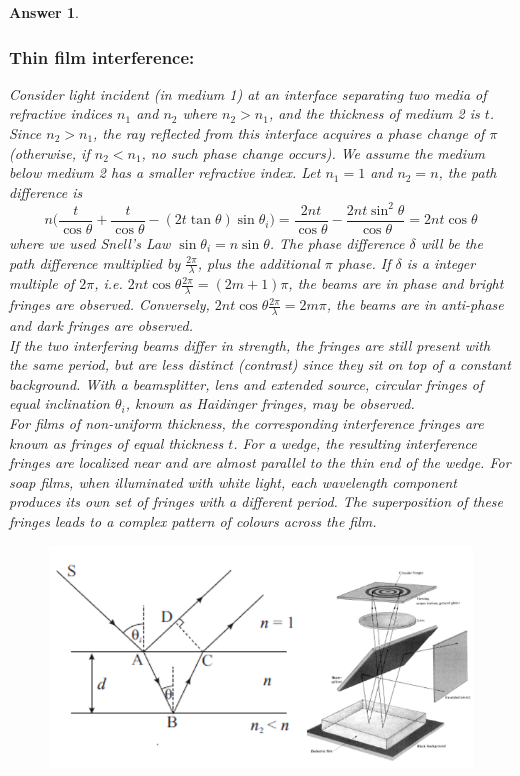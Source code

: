 \documentclass[a4paper]{article}
\newtheorem{ans}{Answer}[subsection]
\theoremstyle{new}
\begin{document}
\begin{ans}
\subsubsection*{Thin film interference:}
Consider light incident (in medium 1) at an interface separating two media of refractive indices $n_1$ and $n_2$ where $n_2>n_1$, and the thickness of medium 2 is $t$. Since $n_2>n_1$, the ray reflected from this interface acquires a phase change of $\pi$ (otherwise, if $n_2<n_1$, no such phase change occurs). We assume the medium below medium 2 has a smaller refractive index. Let $n_1=1$ and $n_2=n$, the path difference is
$$n\bigg(\frac{t}{\cos\theta}+\frac{t}{\cos\theta}-(2t\tan\theta)\sin\theta_i\bigg)=\frac{2nt}{\cos\theta}-\frac{2nt\sin^2\theta}{\cos\theta}=2nt\cos\theta$$
where we used Snell's Law $\sin\theta_i=n\sin\theta$. The phase difference $\delta$ will be the path difference multiplied by $\frac{2\pi}{\lambda}$, plus the additional $\pi$ phase. If $\delta$ is a integer multiple of $2\pi$, i.e. $2nt\cos\theta\frac{2\pi}{\lambda}=(2m+1)\pi$, the beams are in phase and bright fringes are observed. Conversely, $2nt\cos\theta\frac{2\pi}{\lambda}=2m\pi$, the beams are in anti-phase and dark fringes are observed. \\[5pt]
If the two interfering beams differ in strength, the fringes are still present with the same period, but are less distinct (contrast) since they sit on top of a constant background. With a beamsplitter, lens and extended source, circular fringes of equal inclination $\theta_i$, known as Haidinger fringes, may be observed.\\[5pt]
For films of non-uniform thickness, the corresponding interference fringes are known as fringes of equal thickness $t$. For a wedge, the resulting interference fringes are localized near and are almost parallel to the thin end of the wedge. For soap films, when illuminated with white light, each wavelength component produces its own set of fringes with a different period. The superposition of these fringes leads to a complex pattern of colours across the film.
\begin{figure}[H]
\centering
\includegraphics[width=\linewidth]{thinfilm.PNG}
\end{figure}
\newpage

\end{ans}
\end{document}
